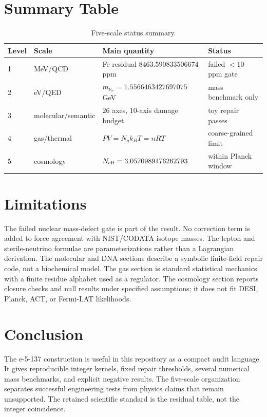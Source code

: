 \documentclass[11pt]{article}
\begin{document}
\section{Summary Table}

\begin{table}[h]
\centering
\caption{Five-scale status summary.}
\begin{tabular}{llll}
\toprule
Level & Scale & Main quantity & Status \\
\midrule
1 & MeV/QCD & Fe residual $8463.590833506674$ ppm & failed $<10$ ppm gate \\
2 & eV/QED & $m_{\nu_{\tau'}}=1.5566463427697075$ GeV & mass benchmark only \\
3 & molecular/semantic & $26$ axes, $10$-axis damage budget & toy repair passes \\
4 & gas/thermal & $PV=N_gk_BT=nRT$ & coarse-grained limit \\
5 & cosmology & $N_{\rm eff}=3.0570989176262793$ & within Planck window \\
\bottomrule
\end{tabular}
\end{table}

\section{Limitations}

The failed nuclear mass-defect gate is part of the result.  No correction term
is added to force agreement with NIST/CODATA isotope masses.  The lepton and
sterile-neutrino formulae are parameterizations rather than a Lagrangian
derivation.  The molecular and DNA sections describe a symbolic finite-field
repair code, not a biochemical model.  The gas section is standard statistical
mechanics with a finite residue alphabet used as a regulator.  The cosmology
section reports closure checks and null results under specified assumptions;
it does not fit DESI, Planck, ACT, or Fermi-LAT likelihoods.

\section{Conclusion}

The e-5-137 construction is useful in this repository as a compact
audit language.  It gives reproducible integer kernels, fixed repair
thresholds, several numerical mass benchmarks, and explicit negative results.
The five-scale organization separates successful engineering tests from
physics claims that remain unsupported.  The retained scientific standard is
the residual table, not the integer coincidence.
\end{document}
